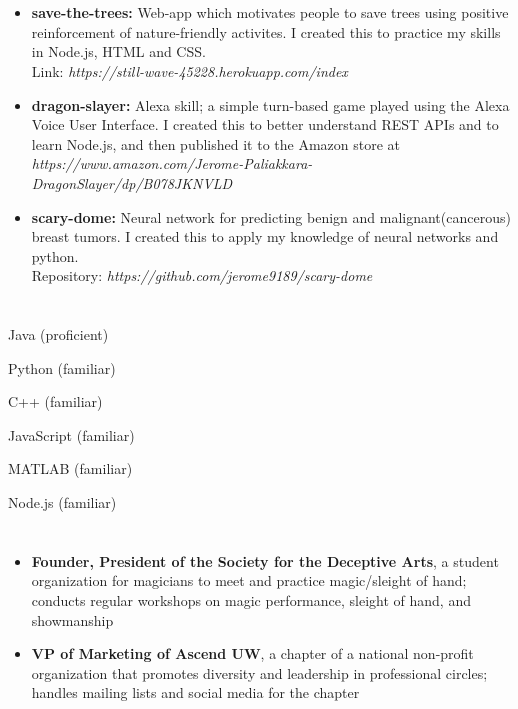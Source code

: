 \documentclass[10pt]{article}
\begin{document}
\begin{spacing}{0.3}
\section*{\color{crimson}{Personal Projects}}
\begin{itemize}
\setlength\itemsep{0.1em}
    \item \textbf{save-the-trees:} Web-app which motivates people to save trees using positive reinforcement of nature-friendly activites. I created this to practice my skills in Node.js, HTML and CSS.\\ Link: \emph{https://still-wave-45228.herokuapp.com/index}
    \item \textbf{dragon-slayer:} Alexa skill; a simple turn-based game played using the Alexa Voice User Interface. I created this to better understand REST APIs and to learn Node.js, and then published it to the Amazon store at\\ \emph{https://www.amazon.com/Jerome-Paliakkara-DragonSlayer/dp/B078JKNVLD}
    \item \textbf{scary-dome:} Neural network for predicting benign and malignant(cancerous) breast tumors. I created this to apply my knowledge of neural networks and python.\\
    Repository: \emph{https://github.com/jerome9189/scary-dome}
\end{itemize}
\section*{\color{crimson}{Skills}}
    \begin{itemize}
    \begin{multicols}{3}
        \item Java (proficient)
        \item Python (familiar)
        \item C++ (familiar)
        \item JavaScript (familiar)
        \item MATLAB (familiar)
        \item Node.js (familiar)
        \end{multicols}
    \end{itemize}
\section*{\color{crimson}{Additional Experience/Leadership}}
\begin{itemize}
    \item \textbf{Founder, President of the Society for the Deceptive Arts}, a student organization for magicians to meet and practice magic/sleight of hand; conducts regular workshops on magic performance, sleight of hand, and showmanship
    \item \textbf{VP of Marketing of Ascend UW}, a chapter of a national non-profit organization that promotes diversity and leadership in professional circles; handles mailing lists and social media for the chapter
\end{itemize}
\end{spacing}
\end{document}
